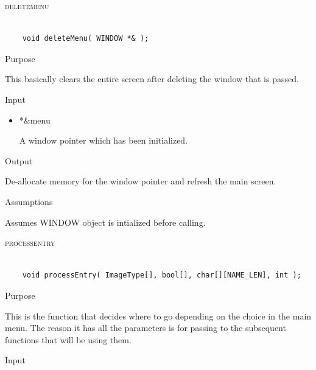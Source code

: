 \documentclass[pdftex, 11pt]{article}
\begin{document}
\begin{description}
\begin{description}
		\end{description}


	\item{\textsc{deletemenu}}

		\begin{lstlisting}

	void deleteMenu( WINDOW *& );
		\end{lstlisting}

		\begin{description}
			\item{Purpose}

				This basically clears the entire screen after deleting the window that is
				passed.

			\item{Input}

				\begin{itemize}

					\item{*\&menu}

						A window pointer which has been initialized.	

				\end{itemize}

			\item{Output}

				De-allocate memory for the window pointer and refresh the
				main screen.

			\item{Assumptions}

				Assumes WINDOW object is intialized before calling.


		\end{description}


	\item{\textsc{processentry}}

		\begin{lstlisting}

	void processEntry( ImageType[], bool[], char[][NAME_LEN], int );
		\end{lstlisting}

		\begin{description}
			\item{Purpose}

				This is the function that decides where to go depending on the choice in the
				main menu.  The reason it has all the parameters is for passing to the
				subsequent functions that will be using them.

			\item{Input}


\end{description}
\end{description}
\end{document}
